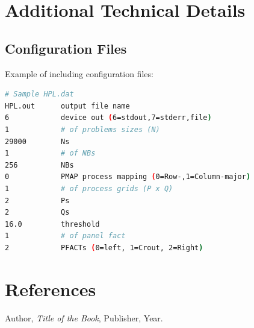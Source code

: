 \documentclass[a4paper,12pt]{article}
\begin{document}
\newpage

\appendix
\section{Additional Technical Details}
\subsection{Configuration Files}
Example of including configuration files:

\begin{lstlisting}[language=bash, caption=HPL Configuration File]
# Sample HPL.dat
HPL.out      output file name
6            device out (6=stdout,7=stderr,file)
1            # of problems sizes (N)
29000        Ns
1            # of NBs
256          NBs
0            PMAP process mapping (0=Row-,1=Column-major)
1            # of process grids (P x Q)
2            Ps
2            Qs
16.0         threshold
1            # of panel fact
2            PFACTs (0=left, 1=Crout, 2=Right)
\end{lstlisting}

\newpage

\section{References}
\begin{thebibliography}{9}
Author, \textit{Title of the Book}, Publisher, Year.
\end{thebibliography}

\newpage
\end{document}
